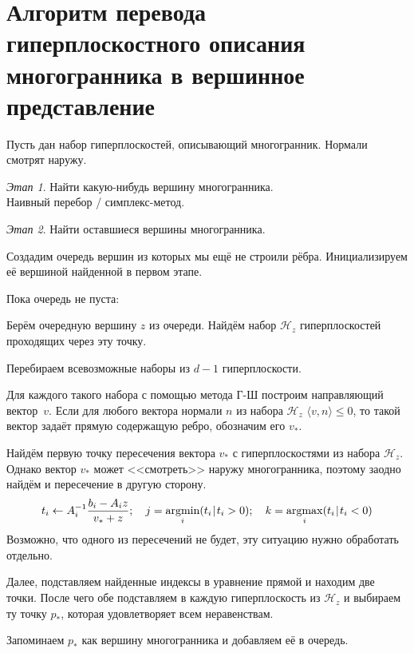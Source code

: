 \documentclass[a4paper,12pt]{article}
\newcommand{\scalprod}[3][]{#1\langle #2, #3 #1\rangle} %
\DeclareMathOperator{\argmin}{argmin}
\DeclareMathOperator{\argmax}{argmax}
\renewcommand{\.}{\hspace{0.2ex}}
\begin{document}
\section{Алгоритм перевода гиперплоскостного описания многогранника в вершинное представление}

  Пусть дан набор гиперплоскостей, описывающий многогранник. Нормали смотрят наружу.

  \textit{Этап 1}. Найти какую-нибудь вершину многогранника. \\
  Наивный перебор / симплекс-метод.

  \textit{Этап 2}. Найти оставшиеся вершины многогранника.

  Создадим очередь вершин из которых мы ещё не строили рёбра. Инициализируем её вершиной найденной в первом этапе.

  Пока очередь не пуста:

  Берём очередную вершину $z$ из очереди. Найдём набор $\mathcal{H}_z$ гиперплоскостей проходящих через эту точку.

  Перебираем всевозможные наборы из $d-1$ гиперплоскости.

  Для каждого такого набора с помощью метода Г-Ш построим направляющий вектор~$v$. Если для любого вектора нормали $n$ из набора $\mathcal{H}_z$ $\scalprod{v}{n} \leqslant 0$, то такой вектор задаёт прямую содержащую ребро, обозначим его $v_*$.

  Найдём первую точку пересечения вектора $v_*$ с гиперплоскостями из набора $\mathcal{H}_z$. Однако вектор $v_*$ может <<смотреть>> наружу многогранника, поэтому заодно найдём и пересечение в другую сторону.
  $$
  t_i \leftarrow A_i^{-1} \frac{b_i - A_i z}{v_* + z}; \quad j = \argmin_i(t_i \. | \. t_i > 0); \quad k = \argmax_i(t_i \. | \. t_i < 0)
  $$
  Возможно, что одного из пересечений не будет, эту ситуацию нужно обработать отдельно.

  Далее, подставляем найденные индексы в уравнение прямой и находим две точки. После чего обе подставляем в каждую гиперплоскость из $\mathcal{H}_z$ и выбираем ту точку $p_*$, которая удовлетворяет всем неравенствам.

  Запоминаем $p_*$ как вершину многогранника и добавляем её в очередь.
\end{document}
